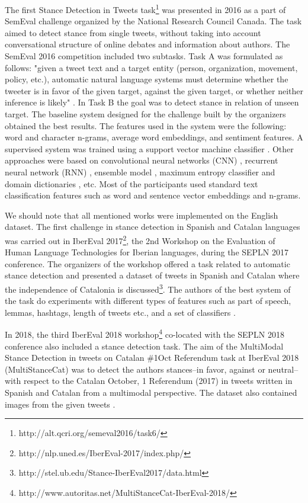 \documentclass[10pt, a4paper]{article}
\begin{document}
The first Stance Detection in Tweets task\footnote{http://alt.qcri.org/semeval2016/task6/} was presented in 2016 as a part of SemEval challenge organized by the National Research Council Canada. The task aimed to detect stance from single tweets, without taking into account conversational structure of online debates and information about authors. The SemEval 2016 competition included two subtasks. Task A was formulated as follows: "given a tweet text and a target entity (person, organization, movement, policy, etc.), automatic natural language systems must determine whether the tweeter is in favor of the given target, against the given target, or whether neither inference is likely"  \cite{mohammad-etal-2016-semeval}. In Task B the goal was to detect stance in relation of unseen target. The baseline system designed for the challenge built by the organizers obtained the best results. The features used in the system were the following: word and character n-grams, average word embeddings, and sentiment features. A supervised system was trained using a support vector machine classifier \cite{mohammad-etal-2016-semeval}. Other approaches were based on convolutional neural networks (CNN) \cite{wei16,VijayaraghavanS16}, recurrent neural network (RNN) \cite{DBLP:journals/corr/ZarrellaM16}, ensemble model \cite{Liu16}, maximum entropy classifier and domain dictionaries \cite{krejzl-steinberger-2016-uwb}, etc. Most of the participants used standard text classification features such as word and sentence vector embeddings and n-grams. 

We should note that all mentioned works were implemented on the English dataset. The first challenge in stance detection in Spanish and Catalan languages was carried out in IberEval 2017\footnote{http://nlp.uned.es/IberEval-2017/index.php/}, the 2nd Workshop on the Evaluation of Human Language Technologies for Iberian languages, during the SEPLN 2017 conference. The organizers of the workshop offered a task related to automatic stance detection and presented a dataset of tweets in Spanish and Catalan \cite{Bosco16,taule17} where the independence of Catalonia is discussed\footnote{http://stel.ub.edu/Stance-IberEval2017/data.html}. The authors of the best system of the task do experiments with different types of features such as part of speech, lemmas, hashtags, length of tweets etc., and a set of classifiers \cite{Lai2017iTACOSAI}.

In 2018, the third IberEval 2018 workshop\footnote{http://www.autoritas.net/MultiStanceCat-IberEval-2018/} co-located with the SEPLN 2018 conference also included a stance detection task. The aim of the MultiModal Stance Detection in tweets on Catalan \#1Oct Referendum task at IberEval 2018 (MultiStanceCat) was to detect the authors stances--in favor, against or neutral-- with respect to the Catalan October, 1 Referendum (2017) in tweets written in Spanish and Catalan from a multimodal perspective. The dataset also contained images from the given tweets \cite{taule18}.
\end{document}
